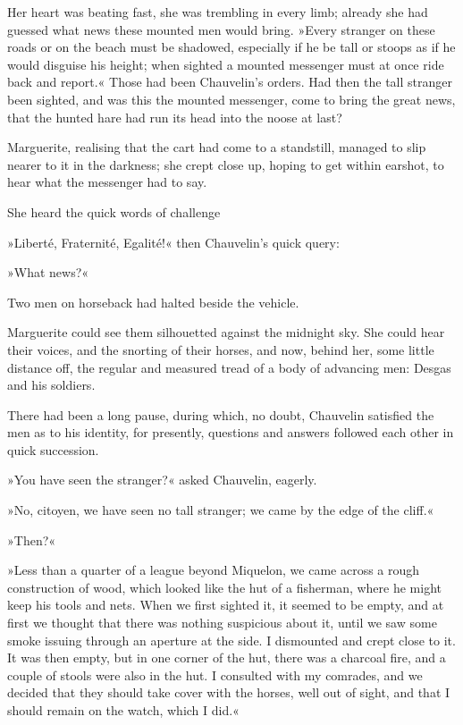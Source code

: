 Her heart was beating fast, she was trembling in every limb; already she had guessed what news these mounted men would bring. »Every stranger on these roads or on the beach must be shadowed, especially if he be tall or stoops as if he would disguise his height; when sighted a mounted messenger must at once ride back and report.« Those had been Chauvelin's orders. Had then the tall stranger been sighted, and was this the mounted messenger, come to bring the great news, that the hunted hare had run its head into the noose at last?

Marguerite, realising that the cart had come to a standstill, managed to slip nearer to it in the darkness; she crept close up, hoping to get within earshot, to hear what the messenger had to say.

She heard the quick words of challenge\longdash


»Liberté, Fraternité, Egalité!« then Chauvelin's quick query:\longdash


»What news?«

Two men on horseback had halted beside the vehicle.

Marguerite could see them silhouetted against the midnight sky. She could hear their voices, and the snorting of their horses, and now, behind her, some little distance off, the regular and measured tread of a body of advancing men: Desgas and his soldiers.

There had been a long pause, during which, no doubt, Chauvelin satisfied the men as to his identity, for presently, questions and answers followed each other in quick succession.

»You have seen the stranger?« asked Chauvelin, eagerly.

»No, citoyen, we have seen no tall stranger; we came by the edge of the cliff.«

»Then?«

»Less than a quarter of a league beyond Miquelon, we came across a rough construction of wood, which looked like the hut of a fisherman, where he might keep his tools and nets. When we first sighted it, it seemed to be empty, and at first we thought that there was nothing suspicious about it, until we saw some smoke issuing through an aperture at the side. I dismounted and crept close to it. It was then empty, but in one corner of the hut, there was a charcoal fire, and a couple of stools were also in the hut. I consulted with my comrades, and we decided that they should take cover with the horses, well out of sight, and that I should remain on the watch, which I did.«


